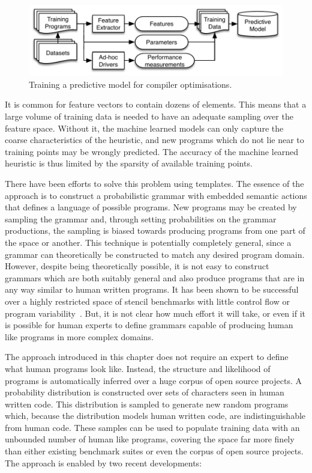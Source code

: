 \begin{figure}
  \includegraphics[width=\columnwidth]{img/overview-a}%
  \caption[Training a predictive model for compiler optimisations]{Training a predictive model for compiler optimisations.}%
  \label{fig:training-a-predictive-model}
\end{figure}

It is common for feature vectors to contain dozens of elements. This means that a large volume of training data is needed to have an adequate sampling over the feature space. Without it, the machine learned models can only capture the coarse characteristics of the heuristic, and new programs which do not lie near to training points may be wrongly predicted. The accuracy of the machine learned heuristic is thus limited by the sparsity of available training points.

There have been efforts to solve this problem using templates. The essence of the approach is to construct a probabilistic grammar with embedded semantic actions that defines a language of possible programs. New programs may be created by sampling the grammar and, through setting probabilities on the grammar productions, the sampling is biased towards producing programs from one part of the space or another. This technique is potentially completely general, since a grammar can theoretically be constructed to match any desired program domain. However, despite being theoretically possible, it is not easy to construct grammars which are both suitably general and also produce programs that are in any way similar to human written programs. It has been shown to be successful over a highly restricted space of stencil benchmarks with little control flow or program variability~\cite{Falch2015,Cummins2016}. But, it is not clear how much effort it will take, or even if it is possible for human experts to define grammars capable of producing human like programs in more complex domains.

The approach introduced in this chapter does not require an expert to define what human programs look like. Instead, the structure and likelihood of programs is automatically inferred over a huge corpus of open source projects. A probability distribution is constructed over sets of characters seen in human written code. This distribution is sampled to generate new random programs which, because the distribution models human written code, are indistinguishable from human code. These samples can be used to populate training data with an unbounded number of human like programs, covering the space far more finely than either existing benchmark suites or even the corpus of open source projects. The approach is enabled by two recent developments:

